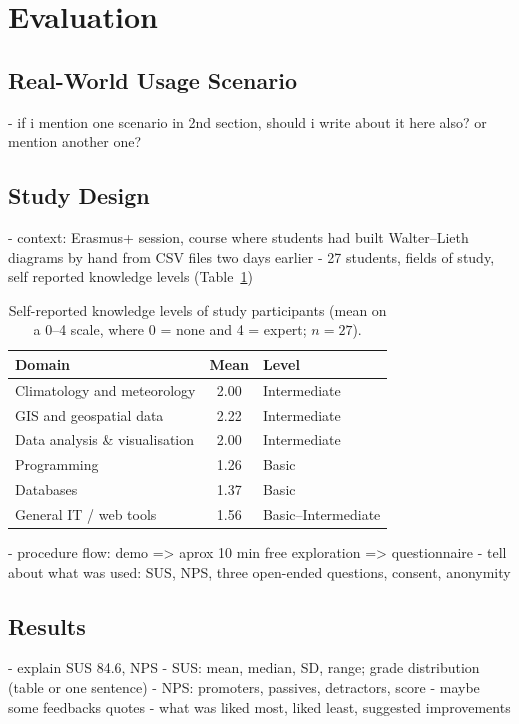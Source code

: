 \section{Evaluation}\label{sec:evaluation} %






\subsection{Real-World Usage Scenario}\label{sec:evaluation:scenarios}
- if i mention one scenario in 2nd section, should i write about it here also? or mention another one?

\subsection{Study Design}\label{sec:evaluation:design}
- context: Erasmus+ session, course where students had built Walter--Lieth diagrams by hand from CSV files two days earlier
- 27 students, fields of study, self reported knowledge levels (Table~\ref{tab:knowledge})

\begin{table}[t]
  \centering
  \caption{Self-reported knowledge levels of study participants
           (mean on a 0--4 scale, where 0 = none and 4 = expert; $n = 27$).}
  \label{tab:knowledge}
  \begin{tabular*}{\textwidth}{@{\extracolsep{\fill}}lcl}
    \toprule
    \textbf{Domain} & \textbf{Mean} & \textbf{Level} \\
    \midrule
    Climatology and meteorology    & 2.00 & Intermediate \\
    GIS and geospatial data        & 2.22 & Intermediate \\
    Data analysis \& visualisation & 2.00 & Intermediate \\
    Programming                    & 1.26 & Basic \\
    Databases                      & 1.37 & Basic \\
    General IT / web tools         & 1.56 & Basic--Intermediate \\
    \bottomrule
  \end{tabular*}
\end{table}

- procedure flow: demo => aprox 10 min free exploration => questionnaire
- tell about what was used: SUS, NPS, three open-ended questions, consent, anonymity

\subsection{Results}\label{sec:evaluation:results}
- explain SUS 84.6, NPS
  - SUS: mean, median, SD, range; grade distribution (table or one sentence)
  - NPS: promoters, passives, detractors, score
- maybe some feedbacks quotes
- what was liked most, liked least, suggested improvements